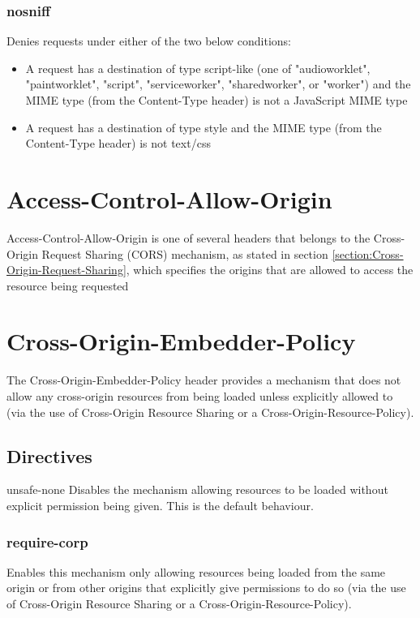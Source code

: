 \documentclass{mscreport}
\begin{document}
\subsubsection{nosniff}

Denies requests under either of the two below conditions:

\begin{itemize}
	\setlength\itemsep{0.1em}
	\item A request has a destination of type script-like (one of "audioworklet", "paintworklet", "script", "serviceworker", "sharedworker", or "worker") and the MIME type (from the Content-Type header) is not a JavaScript MIME type
	\item A request has a destination of type style and the MIME type (from the Content-Type header) is not text/css
\end{itemize}

\newpage

\section{Access-Control-Allow-Origin}

Access-Control-Allow-Origin is one of several headers that belongs to the Cross-Origin Request Sharing (CORS) mechanism, as stated in section \ref{section:Cross-Origin-Request-Sharing}, which specifies the origins that are allowed to access the resource being requested \cite{Apple2006-hk}


\section{Cross-Origin-Embedder-Policy}
The Cross-Origin-Embedder-Policy header provides a mechanism that does not allow any cross-origin resources from being loaded unless explicitly allowed to (via the use of Cross-Origin Resource Sharing or a Cross-Origin-Resource-Policy).

\subsection{Directives}
unsafe-none
Disables the mechanism allowing resources to be loaded without explicit permission being given. This is the default behaviour.

\subsubsection{require-corp}
Enables this mechanism only allowing resources being loaded from the same origin or from other origins that explicitly give permissions to do so (via the use of Cross-Origin Resource Sharing or a Cross-Origin-Resource-Policy).
\end{document}
